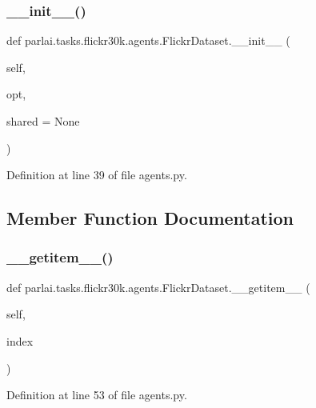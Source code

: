 \subsubsection{\texorpdfstring{\+\_\+\+\_\+init\+\_\+\+\_\+()}{\_\_init\_\_()}}
{\footnotesize\ttfamily def parlai.\+tasks.\+flickr30k.\+agents.\+Flickr\+Dataset.\+\_\+\+\_\+init\+\_\+\+\_\+ (\begin{DoxyParamCaption}\item[{}]{self,  }\item[{}]{opt,  }\item[{}]{shared = {\ttfamily None} }\end{DoxyParamCaption})}



Definition at line 39 of file agents.\+py.



\subsection{Member Function Documentation}
\mbox{\label{classparlai_1_1tasks_1_1flickr30k_1_1agents_1_1FlickrDataset_aba1193cd19baf55824c0ec3bd735b56f}} 
\subsubsection{\texorpdfstring{\+\_\+\+\_\+getitem\+\_\+\+\_\+()}{\_\_getitem\_\_()}}
{\footnotesize\ttfamily def parlai.\+tasks.\+flickr30k.\+agents.\+Flickr\+Dataset.\+\_\+\+\_\+getitem\+\_\+\+\_\+ (\begin{DoxyParamCaption}\item[{}]{self,  }\item[{}]{index }\end{DoxyParamCaption})}



Definition at line 53 of file agents.\+py.



